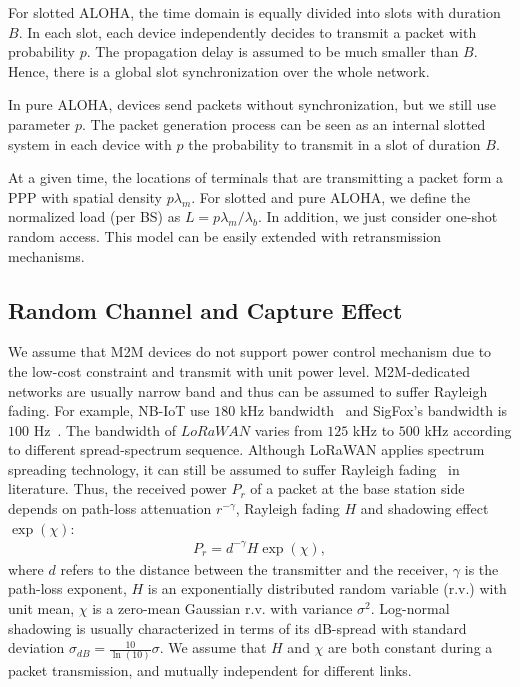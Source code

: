 For slotted ALOHA, the time domain is equally divided into slots with duration $B$. In each slot, each device independently decides to transmit a packet with probability $p$. The propagation delay is assumed to be much smaller than $B$. Hence, there is a global slot synchronization over the whole network.

In pure ALOHA, devices send packets without synchronization, but we still use parameter $p$. The packet generation process can be seen as an internal slotted system in each device with $p$ the probability to transmit in a slot of duration $B$.

At a given time, the locations of terminals that are transmitting a packet form a PPP with spatial density $p\lambda_{m}$. For slotted and pure ALOHA, we define the normalized load (per BS) as $L = p\lambda_{m}/\lambda_{b}$. In addition, we just consider one-shot random access. This model can be easily extended with retransmission mechanisms.
\subsection{Random Channel and Capture Effect}
We assume that M2M devices do not support power control mechanism due to the low-cost constraint and transmit with unit power level. M2M-dedicated networks are usually narrow band and thus can be assumed to suffer Rayleigh fading. For example, NB-IoT use $180$ kHz bandwidth~\cite{wang2017primer} and SigFox's bandwidth is $100$ Hz~\cite{raza2017low}. The bandwidth of $LoRaWAN$ varies from $125$ kHz to $500$ kHz according to different spread-spectrum sequence. Although LoRaWAN applies spectrum spreading technology, it can still be assumed to suffer Rayleigh fading~\cite{georgiou2017low} in literature.
Thus, the received power $P_{r}$ of a packet at the base station side depends on path-loss attenuation $r^{-\gamma}$, Rayleigh fading $H$ and shadowing effect $\exp(\chi)$:
\begin{align}
\label{eq:path-loss}
P_{r} =d^{-\gamma} H \exp(\chi),
\end{align}
where $d$ refers to the distance between the transmitter and the receiver, $\gamma$ is the path-loss exponent, $H$ is an exponentially distributed random variable (r.v.) with unit mean, $\chi$ is a zero-mean Gaussian r.v. with variance $\sigma^2$. Log-normal shadowing is usually characterized in terms of its dB-spread with standard deviation $\sigma_{dB} = \frac{10}{\ln(10)}\sigma$. We assume that $H$ and $\chi$ are both constant during a packet transmission, and mutually independent for different links. 


